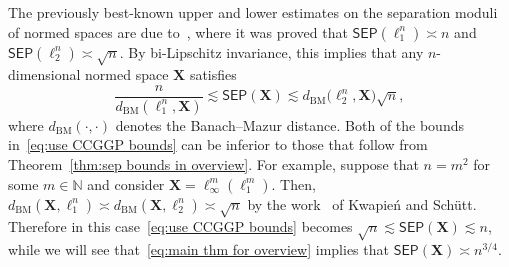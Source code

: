 \documentclass[11pt,reqno]{amsart}
\newcommand{\X}{\mathbf X}
\theoremstyle{remark}
\newcommand{\N}{\mathbb N}
\newcommand{\BM}{\mathrm{BM}}
\renewcommand{\1}{\mathbf 1}
\newcommand{\sep}{\mathsf{SEP}}
\begin{document}
The previously best-known upper and lower estimates on the separation moduli of normed spaces are due to~\cite{CCGGP98}, where it was proved that $\sep(\ell_1^n)\asymp n$ and $\sep(\ell_2^n)\asymp \sqrt{n}$. By bi-Lipschitz invariance, this implies that any $n$-dimensional normed space $\X$ satisfies
\begin{equation}\label{eq:use CCGGP bounds}
\frac{n}{d_{\BM}(\ell_1^n,\X)}\lesssim \sep(\X)\lesssim d_{\BM}\big(\ell_2^n,\X\big)\sqrt{n},
\end{equation}
where $d_{\BM}(\cdot,\cdot)$ denotes the Banach--Mazur distance. Both of the bounds in~\eqref{eq:use CCGGP bounds} can be inferior to those that follow from Theorem~\ref{thm:sep bounds in overview}. For example, suppose that $n=m^2$ for some $m\in \N$ and consider $\X=\ell_\infty^m(\ell_1^m)$. Then, $d_{\BM}(\X,\ell_1^n)\asymp d_{\BM}(\X,\ell_2^n)\asymp  \sqrt{n}$ by the work~\cite{KS89} of Kwapie\'n and Sch\"utt. Therefore in this case~\eqref{eq:use CCGGP bounds} becomes $\sqrt{n}\lesssim \sep(\X)\lesssim n$, while we will see that~\eqref{eq:main thm for overview} implies that $\sep(\X)\asymp n^{3/4}$.
\end{document}
